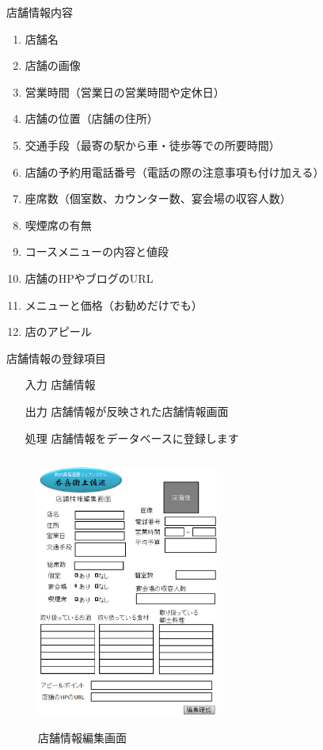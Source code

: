 \documentclass[a4j,titlepage]{jarticle}
\begin{document}
店舗情報内容
\begin{enumerate}
\item 店舗名
\item 店舗の画像
\item 営業時間（営業日の営業時間や定休日）
\item 店舗の位置（店舗の住所）
\item 交通手段（最寄の駅から車・徒歩等での所要時間）
\item 店舗の予約用電話番号（電話の際の注意事項も付け加える）
\item 座席数（個室数、カウンター数、宴会場の収容人数）
\item 喫煙席の有無
\item コースメニューの内容と値段
\item 店舗のHPやブログのURL
\item メニューと価格（お勧めだけでも）
\item 店のアピール
\end{enumerate}


店舗情報の登録項目
\begin{enumerate}
  \item [入力] 店舗情報
  \item [出力] 店舗情報が反映された店舗情報画面
  \item [処理] 店舗情報をデータベースに登録します
\end{enumerate}

\begin{figure}[htbp]
  \begin{center}
  \includegraphics [height=9cm, width=6cm]{extrnal1_design_document_image/s6.eps}
  \caption{店舗情報編集画面}
  \label {fig:s6}
  \end{center}
\end{figure}
\end{document}
